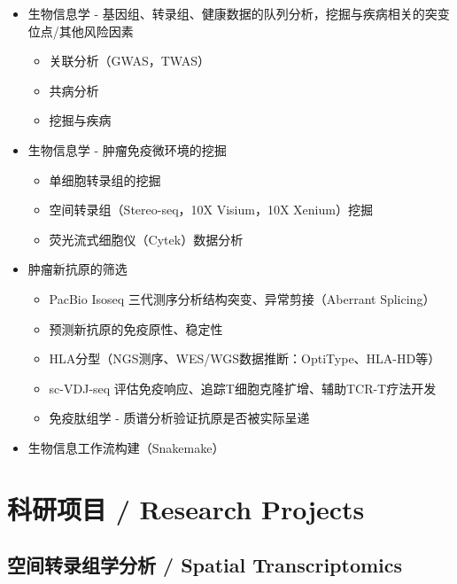 \documentclass[11pt,a4paper]{article}
\begin{document}
\begin{itemize}[leftmargin=*,nosep]
\item 生物信息学 - 基因组、转录组、健康数据的队列分析，挖掘与疾病相关的突变位点/其他风险因素
  \begin{itemize}[leftmargin=*]
  \item 关联分析（GWAS，TWAS）
  \item 共病分析
  \item 挖掘与疾病
  \end{itemize}
\item 生物信息学 - 肿瘤免疫微环境的挖掘
  \begin{itemize}[leftmargin=*]
  \item 单细胞转录组的挖掘
  \item 空间转录组（Stereo-seq，10X Visium，10X Xenium）挖掘
  \item 荧光流式细胞仪（Cytek）数据分析
  \end{itemize}
\item 肿瘤新抗原的筛选
  \begin{itemize}[leftmargin=*]
  \item PacBio Isoseq 三代测序分析结构突变、异常剪接（Aberrant Splicing）
  \item 预测新抗原的免疫原性、稳定性
  \item HLA分型（NGS测序、WES/WGS数据推断：OptiType、HLA-HD等）
  \item sc-VDJ-seq 评估免疫响应、追踪T细胞克隆扩增、辅助TCR-T疗法开发
  \item 免疫肽组学 - 质谱分析验证抗原是否被实际呈递
  \end{itemize}
\item 生物信息工作流构建（Snakemake）
\end{itemize}

\section*{科研项目 / Research Projects}

\subsection*{空间转录组学分析 / Spatial Transcriptomics}
\end{document}
